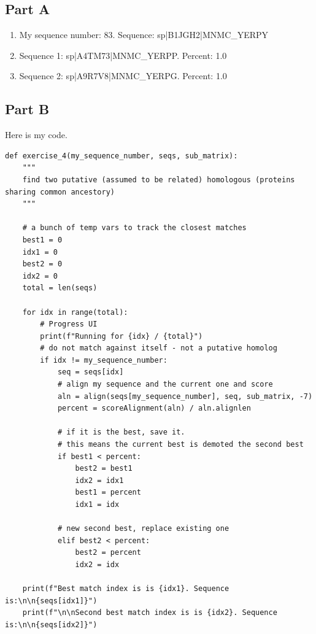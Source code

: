 \documentclass{article} %
\begin{document}
\subsection{Part A}

\begin{enumerate}
    \item My sequence number: 83. Sequence: sp|B1JGH2|MNMC\_YERPY
    \item Sequence 1: sp|A4TM73|MNMC\_YERPP. Percent: 1.0
    \item Sequence 2: sp|A9R7V8|MNMC\_YERPG. Percent: 1.0
\end{enumerate}

\subsection{Part B}

Here is my code.

\begin{verbatim}
def exercise_4(my_sequence_number, seqs, sub_matrix):
    """
    find two putative (assumed to be related) homologous (proteins sharing common ancestory)
    """

    # a bunch of temp vars to track the closest matches
    best1 = 0
    idx1 = 0
    best2 = 0
    idx2 = 0
    total = len(seqs)

    for idx in range(total):
        # Progress UI
        print(f"Running for {idx} / {total}")
        # do not match against itself - not a putative homolog
        if idx != my_sequence_number:
            seq = seqs[idx]
            # align my sequence and the current one and score
            aln = align(seqs[my_sequence_number], seq, sub_matrix, -7)
            percent = scoreAlignment(aln) / aln.alignlen

            # if it is the best, save it.
            # this means the current best is demoted the second best
            if best1 < percent:
                best2 = best1
                idx2 = idx1
                best1 = percent
                idx1 = idx

            # new second best, replace existing one
            elif best2 < percent:
                best2 = percent
                idx2 = idx

    print(f"Best match index is is {idx1}. Sequence is:\n\n{seqs[idx1]}")
    print(f"\n\nSecond best match index is is {idx2}. Sequence is:\n\n{seqs[idx2]}")
\end{verbatim}
\end{document}
